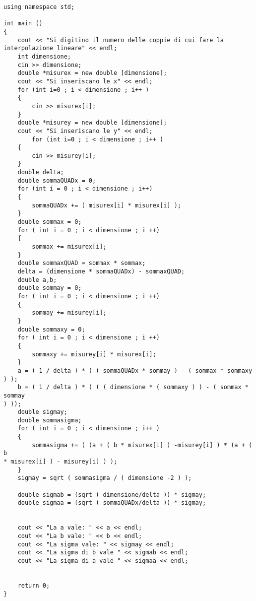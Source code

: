 \begin{verbatim}
using namespace std;

int main ()
{
	cout << "Si digitino il numero delle coppie di cui fare la 
interpolazione lineare" << endl;
	int dimensione;
	cin >> dimensione;
	double *misurex = new double [dimensione];
	cout << "Si inseriscano le x" << endl;
	for (int i=0 ; i < dimensione ; i++ )
	{
		cin >> misurex[i];
	}
    double *misurey = new double [dimensione];
	cout << "Si inseriscano le y" << endl;
		for (int i=0 ; i < dimensione ; i++ )
	{
		cin >> misurey[i];
	}
	double delta;
	double sommaQUADx = 0;
	for (int i = 0 ; i < dimensione ; i++)
	{
		sommaQUADx += ( misurex[i] * misurex[i] );
	}
	double sommax = 0;
	for ( int i = 0 ; i < dimensione ; i ++)
	{
		sommax += misurex[i];
	}
	double sommaxQUAD = sommax * sommax;
	delta = (dimensione * sommaQUADx) - sommaxQUAD;
	double a,b;
	double sommay = 0;
	for ( int i = 0 ; i < dimensione ; i ++)
	{
		sommay += misurey[i];
	}
	double sommaxy = 0;
	for ( int i = 0 ; i < dimensione ; i ++)
	{
		sommaxy += misurey[i] * misurex[i];
	}
	a = ( 1 / delta ) * ( ( sommaQUADx * sommay ) - ( sommax * sommaxy ) );
	b = ( 1 / delta ) * ( ( ( dimensione * ( sommaxy ) ) - ( sommax * sommay 
) ));
	double sigmay;
	double sommasigma;
	for ( int i = 0 ; i < dimensione ; i++ )
	{
		sommasigma += ( (a + ( b * misurex[i] ) -misurey[i] ) * (a + ( b 
* misurex[i] ) - misurey[i] ) );
	}
	sigmay = sqrt ( sommasigma / ( dimensione -2 ) );
    
    double sigmab = (sqrt ( dimensione/delta )) * sigmay;
    double sigmaa = (sqrt ( sommaQUADx/delta )) * sigmay;

    
	cout << "La a vale: " << a << endl;
	cout << "La b vale: " << b << endl;
	cout << "La sigma vale: " << sigmay << endl;
    cout << "La sigma di b vale " << sigmab << endl;
    cout << "La sigma di a vale " << sigmaa << endl;

                       
	return 0;
}

\end{verbatim}
